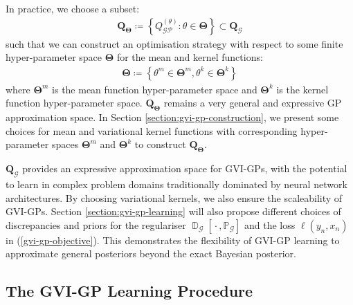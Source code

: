 \documentclass{article}
\newcommand{\D}{\operatorname{\mathbb{D}}}
\newcommand{\GP}{\operatorname{\mathcal{GP}}}
\newcommand{\wc}{\operatorname{{}\cdot{}}}
\numberwithin{equation}{section}
\begin{document}
In practice, we choose a subset:
\begin{align}
    \boldsymbol{Q}_{\boldsymbol{\Theta}} \coloneqq \left\{ 
    Q^{(\theta)}_{\GP}: \theta \in \boldsymbol{\Theta} 
    \right\} \subset \boldsymbol{Q}_{\mathcal{G}}
\end{align}
such that we can construct an optimisation strategy with respect to some finite hyper-parameter space $\boldsymbol{\Theta}$ for the mean and kernel functions:
\begin{align}
    \boldsymbol{\Theta} \coloneqq \left\{\theta^m \in \boldsymbol{\Theta}^m, \theta^k \in \boldsymbol{\Theta}^k \right\}
\end{align}
where $\boldsymbol{\Theta}^m$ is the mean function hyper-parameter space and $\boldsymbol{\Theta}^k$ is the kernel function hyper-parameter space. $\boldsymbol{Q}_{\boldsymbol{\Theta}}$ remains a very general and expressive GP approximation space. 
In Section \ref{section:gvi-gp-construction}, we present some choices for mean and variational kernel functions with corresponding hyper-parameter spaces $\boldsymbol{\Theta}^m$ and $\boldsymbol{\Theta}^k$ to construct $\boldsymbol{Q}_{\boldsymbol{\Theta}}$. 

$\boldsymbol{Q}_{\mathcal{G}}$ provides an expressive approximation space for GVI-GPs, with the potential to learn in complex problem domains traditionally dominated by neural network architectures.
By choosing variational kernels, we also ensure the scaleability of GVI-GPs. 
Section \ref{section:gvi-gp-learning} will also propose different choices of discrepancies and priors for the regulariser $\D_{\mathcal{G}}\left[\wc, \mathbb{P}_{\mathcal{G}}\right]$ and the loss $\ell(y_n, x_n)$ in (\ref{gvi-gp-objective}). This demonstrates the flexibility of GVI-GP learning to approximate general posteriors beyond the exact Bayesian posterior.

\subsection{The GVI-GP Learning Procedure}
\end{document}
